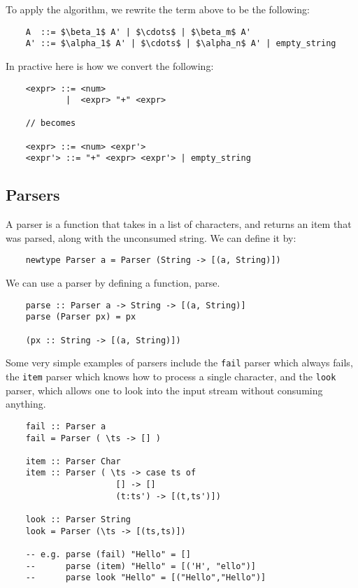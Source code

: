 \documentclass[a4paper,12pt]{article}
\theoremstyle{remark}
\begin{document}
To apply the algorithm, we rewrite the term above to be the following:

\begin{lstlisting}
    A  ::= $\beta_1$ A' | $\cdots$ | $\beta_m$ A'
    A' ::= $\alpha_1$ A' | $\cdots$ | $\alpha_n$ A' | empty_string  \end{lstlisting}

In practive here is how we convert the following:

\begin{lstlisting}
    <expr> ::= <num>
            |  <expr> "+" <expr>

    // becomes

    <expr> ::= <num> <expr'>
    <expr'> ::= "+" <expr> <expr'> | empty_string  \end{lstlisting}

\subsection{Parsers}

A parser is a function that takes in a list of characters, and returns an item that
was parsed, along with the unconsumed string. We can define it by:

\begin{lstlisting}
    newtype Parser a = Parser (String -> [(a, String)])  \end{lstlisting}

We can use a parser by defining a function, parse.

\begin{lstlisting}
    parse :: Parser a -> String -> [(a, String)]
    parse (Parser px) = px

    (px :: String -> [(a, String)])  \end{lstlisting}

Some very simple examples of parsers include the \lstinline{fail} parser which always fails,
the \lstinline{item} parser which knows how to process a single character, and the
\lstinline{look} parser, which allows one to look into the input stream without consuming anything.

\begin{lstlisting}
    fail :: Parser a
    fail = Parser ( \ts -> [] )

    item :: Parser Char
    item :: Parser ( \ts -> case ts of
                      [] -> []
                      (t:ts') -> [(t,ts')])

    look :: Parser String
    look = Parser (\ts -> [(ts,ts)])

    -- e.g. parse (fail) "Hello" = []
    --      parse (item) "Hello" = [('H', "ello")]
    --      parse look "Hello" = [("Hello","Hello")]  \end{lstlisting}
\end{document}
